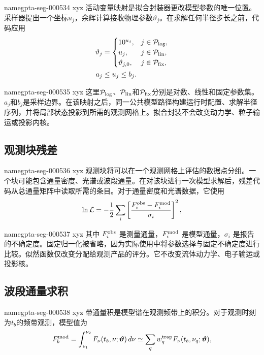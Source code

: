 \documentclass[twocolumn]{aastex702}
\makeatletter
\providecommand{\gptareaderanchor}[1]{\pdfdest name{#1} xyz}%
\providecommand{\gptareaderanchor}[1]{\special{pdf:dest (#1) [ @thispage /XYZ @xpos @ypos null ]}}%
\makeatother
\begin{document}
\gptareaderanchor{gpta-seg-000534}%
活动变量映射是拟合封装器更改模型参数的唯一位置。采样器提出一个坐标\(u_j\)，余辉计算接收物理参数\(\vartheta_j\)。在求解任何半径步长之前，代码应用
\begin{equation}
\begin{aligned}
\vartheta_j&=
\begin{cases}
10^{u_j}, & j\in{\cal P}_{\log},\\
u_j, & j\in{\cal P}_{\rm lin},\\
\vartheta_{j,0}, & j\in{\cal P}_{\rm fix},
\end{cases}\\
a_j&\le u_j\le b_j .
\end{aligned}
\end{equation}

\gptareaderanchor{gpta-seg-000535}%
这里\({\cal P}_{\log}\)、\({\cal P}_{\rm lin}\)和\({\cal P}_{\rm fix}\)分别是对数、线性和固定参数集。\(a_j\)和\(b_j\)是采样边界。在该映射之后，同一公共模型路径构建运行时配置、求解半径序列，并将局部状态投影到所需的观测网格上。拟合封装不会改变动力学、粒子输运或投影内核。

\subsection{观测块残差}


\gptareaderanchor{gpta-seg-000536}%
观测块将可以在一个观测网格上评估的数据点分组。一个块可能包含通量密度、光谱或波段通量。在对该块进行一次模型求解后，残差代码从总通量矩阵中读取所需的条目。对于通量密度和光谱数据，它使用
\begin{equation}
\ln\mathcal{L}
=-\frac{1}{2}\sum_i
\left[
\frac{F_i^{\rm obs}-F_i^{\rm mod}}{\sigma_i}
\right]^2 ,
\end{equation}

\gptareaderanchor{gpta-seg-000537}%
其中 \(F_i^{\rm obs}\) 是测量通量，\(F_i^{\rm mod}\) 是模型通量，\(\sigma_i\) 是报告的不确定度。固定归一化被省略，因为实际使用中将参数选择与固定不确定度进行比较。似然函数仅改变分配给观测产品的评分。它不改变流体动力学、电子输运或投影核。

\subsection{波段通量求积}


\gptareaderanchor{gpta-seg-000538}%
带通量积是模型谱在观测频带上的积分。对于观测时刻为\(t_b\)的频带观测，模型值为
\begin{equation}
F_b^{\rm mod}
=\int_{\nu_1}^{\nu_2}F_\nu(t_b,\nu;\boldsymbol{\vartheta})\,d\nu
\simeq
\sum_q w_q^{\rm trap}
F_\nu(t_b,\nu_q;\boldsymbol{\vartheta}) ,
\end{equation}
\end{document}
